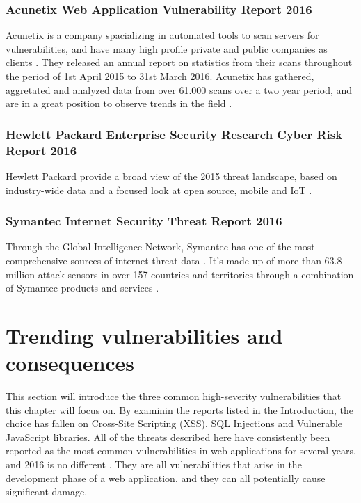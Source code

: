 \subsubsection{Acunetix Web Application Vulnerability Report 2016}
Acunetix is a company spacializing in automated tools to scan servers for vulnerabilities, and have many high profile private and public companies as clients \cite{AcunetixCompany}. They released an annual report on statistics from their scans throughout the period of 1st April 2015 to 31st March 2016. Acunetix has gathered, aggretated and analyzed data from over 61.000 scans over a two year period, and are in a great position to observe trends in the field \cite{Acunetix2016}. 
\subsubsection{Hewlett Packard Enterprise Security Research Cyber Risk Report 2016}
Hewlett Packard provide a broad view of the 2015 threat landscape, based on industry-wide data and a focused look at open source, mobile and IoT \cite{HP2016}.
\subsubsection{Symantec Internet Security Threat Report 2016}
Through the Global Intelligence Network, Symantec has one of the most comprehensive sources of internet threat data \cite{Symantec2016}. It's made up of more than 63.8 million attack sensors in over 157 countries and territories through a combination of Symantec products and services \cite{Symantec2016}.
\pagebreak
\section{Trending vulnerabilities and consequences}
This section will introduce the three common high-severity vulnerabilities that this chapter will focus on. By examinin the reports listed in the Introduction, the choice has fallen on Cross-Site Scripting (XSS), SQL Injections and Vulnerable JavaScript libraries. All of the threats described here have consistently been reported as the most common vulnerabilities in web applications for several years, and 2016 is no different \cite{OWASP2010}\cite{OWASP2013}\cite{Acunetix2016}. They are all vulnerabilities that arise in the development phase of a web application, and they can all potentially cause significant damage. 
